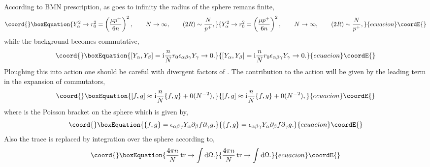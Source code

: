 \documentclass[a4paper]{article}
\providecommand{\ii}{\mathrm{i}}
\providecommand{\dd}{\mathrm{d}}
\providecommand{\pd}{\partial}
\providecommand{\tr}{\mathop{\mathrm{tr}}\nolimits}
\begin{document}
According to BMN prescription, as \coordHE{} goes to infinity the radius of
the sphere remans finite,
\begin{equation}\coord{}\boxEquation{\label{N->infty}
Y_\alpha^2\to r_0^2=\left(\frac{\mu p^+}{6n}\right)^2,\qquad
N\to\infty, \qquad (2R)\sim \frac{N}{p^+},
}{Y_\alpha^2\to r_0^2=\left(\frac{\mu p^+}{6n}\right)^2,\qquad
N\to\infty, \qquad (2R)\sim \frac{N}{p^+},
}{ecuacion}\coordE{}\end{equation}
while the background becomes commutative,
\begin{equation}\coord{}\boxEquation{
[Y_\alpha,Y_\beta]=\ii
\frac{n}{N}r_0\epsilon_{\alpha\beta\gamma}Y_\gamma\to 0.
}{
[Y_\alpha,Y_\beta]=\ii
\frac{n}{N}r_0\epsilon_{\alpha\beta\gamma}Y_\gamma\to 0.
}{ecuacion}\coordE{}\end{equation}
Ploughing this into action one should be careful with divergent
factors of \coordHE{}. The contribution to the action will be given by
the leading term in the expansion of commutators,
\begin{equation}\coord{}\boxEquation{\label{com->pb}
[f,g]\approx \ii\frac{n}{N}\{f,g\}+0(N^{-2}),
}{[f,g]\approx \ii\frac{n}{N}\{f,g\}+0(N^{-2}),
}{ecuacion}\coordE{}\end{equation}
where \myHighlight{$\{,\}$}\coordHE{} is the Poisson bracket on the sphere which is given by,
\begin{equation}\coord{}\boxEquation{\label{pb}
\{f,g\}=\epsilon_{\alpha\beta\gamma}Y_\alpha\pd_\beta f\pd_\gamma g.
}{\{f,g\}=\epsilon_{\alpha\beta\gamma}Y_\alpha\pd_\beta f\pd_\gamma g.
}{ecuacion}\coordE{}\end{equation}
Also the trace is replaced by integration over the sphere according
to,
\begin{equation}\coord{}\boxEquation{\label{tr->int}
\frac{4\pi n}{N}\tr\to \int \dd \Omega.
}{\frac{4\pi n}{N}\tr\to \int \dd \Omega.
}{ecuacion}\coordE{}\end{equation}
\end{document}
